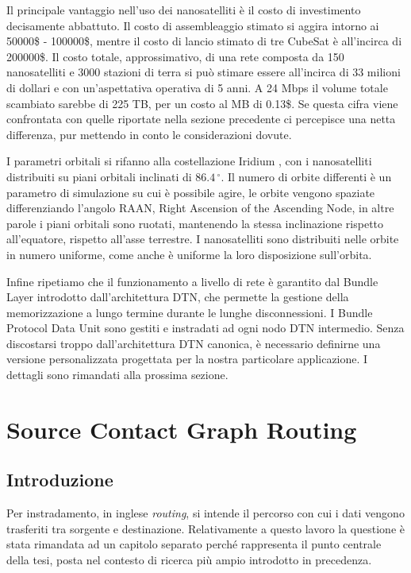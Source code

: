 \documentclass[12pt,a4paper,oneside]{book}
\begin{document}
		Il principale vantaggio nell'uso dei nanosatelliti è il costo di investimento decisamente abbattuto. Il costo di assembleaggio stimato si aggira intorno ai 50000\$ - 100000\$, mentre il costo di lancio stimato di tre CubeSat è all'incirca di 200000\$. Il costo totale, approssimativo, di una rete composta da 150 nanosatelliti e 3000 stazioni di terra si può stimare essere all'incirca di 33 milioni di dollari e con un'aspettativa operativa di 5 anni. A 24 Mbps il volume totale scambiato sarebbe di 225 TB, per un costo al MB di 0.13\$. Se questa cifra viene confrontata con quelle riportate nella sezione precedente ci percepisce una netta differenza, pur mettendo in conto le considerazioni dovute. 
		
		I parametri orbitali si rifanno alla costellazione Iridium \cite{fossa1998overview}, con i nanosatelliti distribuiti su piani orbitali inclinati di $86.4\,^{\circ}$. Il numero di orbite differenti è un parametro di simulazione su cui è possibile agire, le orbite vengono spaziate differenziando l'angolo RAAN, Right Ascension of the Ascending Node, in altre parole i piani orbitali sono ruotati, mantenendo la stessa inclinazione rispetto all'equatore, rispetto all'asse terrestre. I nanosatelliti sono distribuiti nelle orbite in numero uniforme, come anche è uniforme la loro disposizione sull'orbita. 
		
		Infine ripetiamo che il funzionamento a livello di rete è garantito dal Bundle Layer introdotto dall'architettura DTN, che permette la gestione della memorizzazione a lungo termine durante le lunghe disconnessioni. I Bundle Protocol Data Unit sono gestiti e instradati ad ogni nodo DTN intermedio. Senza discostarsi troppo dall'architettura DTN canonica, è necessario definirne una versione personalizzata progettata per la nostra particolare applicazione. I dettagli sono rimandati alla prossima sezione. 
		
			
		
		
	\chapter{Source Contact Graph Routing}
	
		\section{Introduzione}
		Per instradamento, in inglese {\it routing}, si intende il percorso con cui i dati vengono trasferiti tra sorgente e destinazione. Relativamente a questo lavoro la questione è stata rimandata ad un capitolo separato perché rappresenta il punto centrale della tesi, posta nel contesto di ricerca più ampio introdotto in precedenza. 
		
\end{document}
